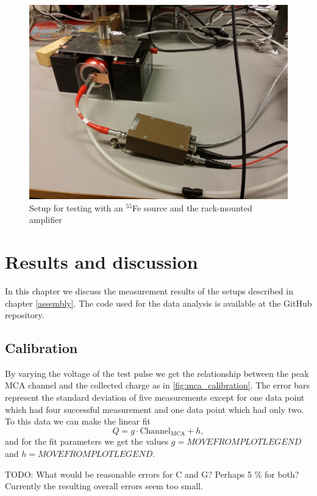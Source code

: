 \documentclass[a4paper]{article}
\begin{document}
\begin{figure}[ht!]
\centering
\includegraphics[width=\textwidth]{fig/IMG_20201130_144418.jpg}
\caption{Setup for testing with an $^{55}$Fe source and the rack-mounted amplifier}
\label{fig:setup_testing}
\end{figure}


\clearpage
\section{Results and discussion}
\label{results}
In this chapter we discuss the measurement results of the setups described in chapter \ref{assembly}.
The code used for the data analysis is available at the GitHub repository. \cite{repo}


\subsection{Calibration}
\label{results_calibration}
By varying the voltage of the test pulse we get the relationship between the peak MCA channel and the collected charge as in \ref{fig:mca_calibration}.
The error bars represent the standard deviation of five measurements except for one data point which had four successful measurement and one data point which had only two.
To this data we can make the linear fit
\begin{equation}
Q = g \cdot \text{Channel}_\text{MCA} + h,
\end{equation}
and for the fit parameters we get the values $g = MOVEFROMPLOTLEGEND$ and $h = MOVEFROMPLOTLEGEND$.

TODO: What would be reasonable errors for C and G?
Perhaps 5 \% for both?
Currently the resulting overall errors seem too small.
\end{document}
